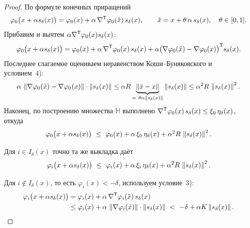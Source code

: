 \begin{proof}
По формуле конечных приращений
\[
  \varphi_0\big(x + \alpha s_\delta(x)\big)
  = \varphi_0(x) + \alpha\,\nabla^{\mathsf{T}}\varphi_0(\tilde{x})\, s_\delta(x) ,
  \qquad
  \tilde{x} = x + \theta\,\alpha\, s_\delta(x) , \quad \theta \in [0,1] .
\]
Прибавим и вычтем $\alpha \nabla^{\mathsf{T}}\varphi_0(x) s_\delta(x)$:
\[
  \varphi_0\big(x + \alpha s_\delta(x)\big)
  = \varphi_0(x) + \alpha\,\nabla^{\mathsf{T}}\varphi_0(x)\, s_\delta(x)
    + \alpha\big(\nabla\varphi_0(\tilde{x}) - \nabla\varphi_0(x)\big)^{\mathsf{T}} s_\delta(x) .
\]
Последнее слагаемое оцениваем неравенством Коши--Буняковского и условием~4):
\[
  \alpha\,\norm{\nabla\varphi_0(\tilde{x}) - \nabla\varphi_0(x)}\cdot
  \norm{s_\delta(x)}
  \le \alpha R \underbrace{\norm{\tilde{x} - x}}_{=\ \theta\alpha\norm{s_\delta(x)}}
      \norm{s_\delta(x)}
  \le \alpha^2 R\, \norm{s_\delta(x)}^2 .
\]
Наконец, по построению множества $\mathbb{H}$ выполнено
$\nabla^{\mathsf{T}}\varphi_0(x)\, s_\delta(x) \le \xi_0\, \eta_\delta(x)$, откуда
\begin{equation}\label{eq:zout-2}
  \varphi_0\big(x + \alpha s_\delta(x)\big)
  \ \le\ \varphi_0(x) + \alpha\,\xi_0\,\eta_\delta(x)
         + \alpha^2 R\,\left\lVert s_\delta(x) \right\rVert^2 .
\end{equation}

Для $i \in I_\delta(x)$ точно та же выкладка даёт
\begin{equation}\label{eq:zout-3}
  \varphi_i\big(x + \alpha s_\delta(x)\big)
  \ \le\ \varphi_i(x) + \alpha\,\xi_i\,\eta_\delta(x)
         + \alpha^2 R\,\left\lVert s_\delta(x) \right\rVert^2 .
\end{equation}

Для $i \notin I_\delta(x)$, то есть $\varphi_i(x) < -\delta$, используем
условие~3):
\begin{equation}\label{eq:zout-4}
  \begin{aligned}
    \varphi_i\big(x + \alpha s_\delta(x)\big)
    &= \varphi_i(x) + \alpha\,\nabla^{\mathsf{T}}\varphi_i(\tilde{x})\, s_\delta(x) \\
    &\le \varphi_i(x)
       + \alpha\,\left\lVert \nabla\varphi_i(\tilde{x}) \right\rVert\cdot\left\lVert s_\delta(x) \right\rVert
     \ <\ -\delta + \alpha K \left\lVert s_\delta(x) \right\rVert .
  \end{aligned}
\end{equation}


\end{proof}
